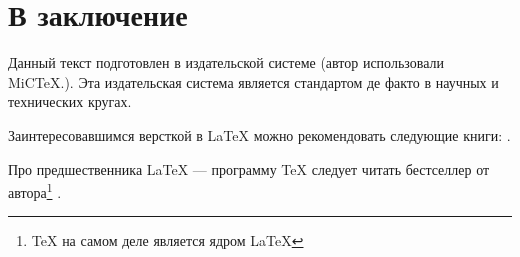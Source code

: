 \chapter*{В заключение}

Данный текст подготовлен в издательской системе {\LaTeXe} (автор использовали MiC\TeX.). Эта издательская система является стандартом де факто в научных и технических кругах.

Заинтересовавшимся версткой в {\LaTeX} можно рекомендовать следующие книги: \cite{bib:cotelnikov,bib:baldin}.

Про предшественника {\LaTeX} --- программу {\TeX} следует читать бестселлер от автора\footnote{{\TeX} на самом деле является ядром \LaTeX} \cite{bib:knuth:AllAbout}.
